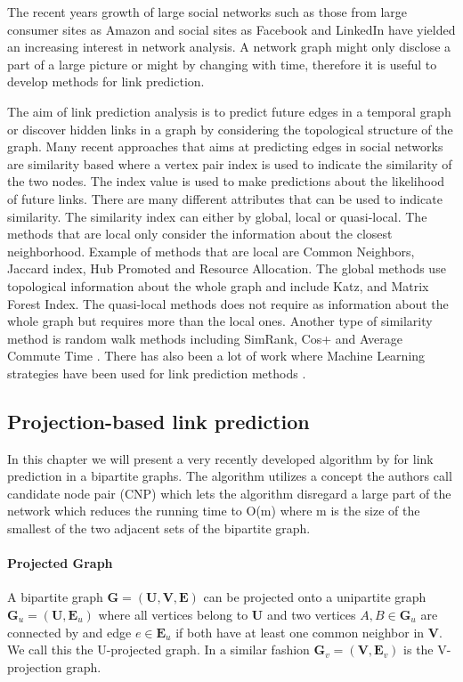 The recent years growth of large social networks such as those from large consumer sites as Amazon and social sites as Facebook and LinkedIn have yielded an increasing interest in network analysis. A network graph might only disclose a part of a large picture or might by changing with time, therefore it is useful to develop methods for link prediction.

The aim of link prediction analysis is to predict future edges in a temporal graph or discover hidden links in a graph by considering the topological structure of the graph. Many recent approaches that aims at predicting edges in social networks are similarity based where a vertex pair index is used to indicate the similarity of the two nodes. The index value is used to make predictions about the likelihood of future links. There are many different attributes that can be used to indicate similarity. The similarity index can either by global, local or quasi-local. The methods that are local only consider the information about the closest neighborhood. Example of methods that are local are Common Neighbors, Jaccard index, Hub Promoted and Resource Allocation\cite{linkpredict}. The global methods use topological information about the whole graph and include Katz, and Matrix Forest Index\cite{linkpredict}. The quasi-local methods does not require as information about the whole graph but requires more than the local ones. Another type of similarity method is random walk methods including SimRank, Cos+ and Average Commute Time \cite{linkpredict}. There has also been a lot of work where Machine Learning strategies have been used for link prediction methods \cite{mlpredict1,mlpredict2,mlpredict3,mlpredict4,mlpredict5,mlpredict6,mlpredict7}.

\subsection{Projection-based link prediction}\label{sec:plp}
In this chapter we will present a very recently developed algorithm by \citet{plp} for link prediction in a bipartite graphs. The algorithm utilizes a concept the authors call candidate node pair (CNP) which lets the algorithm disregard a large part of the network which reduces the running time to O(m) where m is the size of the smallest of the two adjacent sets of the bipartite graph.

\paragraph{Projected Graph}
A bipartite graph $\textbf{G} = (\textbf{U},\textbf{V},\textbf{E})$ can be projected onto a unipartite graph $\textbf{G}_u = (\textbf{U},\textbf{E}_u)$ where all vertices belong to $\textbf{U}$ and two vertices $A,B\in\textbf{G}_u$ are connected by and edge $e\in\textbf{E}_u$ if both have at least one common neighbor in $\textbf{V}$. We call this the U-projected graph. In a similar fashion $\textbf{G}_v = (\textbf{V},\textbf{E}_v)$ is the V-projection graph.

